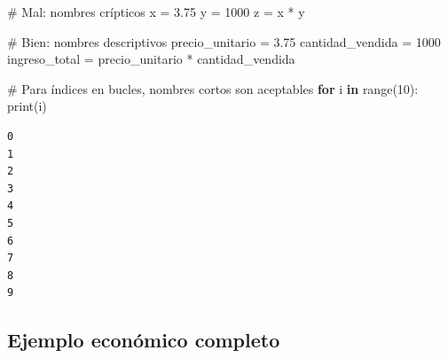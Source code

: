 \documentclass[
  doc,
  floatsintext,
  longtable,
  a4paper,
  nolmodern,
  notxfonts,
  notimes,
  12pt,
  colorlinks=true,linkcolor=blue,citecolor=blue,urlcolor=blue]{apa7}
\newenvironment{Shaded}{\begin{snugshade}}{\end{snugshade}}
\newcommand{\BuiltInTok}[1]{\textcolor[rgb]{0.00,0.23,0.31}{#1}}
\newcommand{\CommentTok}[1]{\textcolor[rgb]{0.37,0.37,0.37}{#1}}
\newcommand{\ControlFlowTok}[1]{\textcolor[rgb]{0.00,0.23,0.31}{\textbf{#1}}}
\newcommand{\DecValTok}[1]{\textcolor[rgb]{0.68,0.00,0.00}{#1}}
\newcommand{\FloatTok}[1]{\textcolor[rgb]{0.68,0.00,0.00}{#1}}
\newcommand{\KeywordTok}[1]{\textcolor[rgb]{0.00,0.23,0.31}{\textbf{#1}}}
\newcommand{\NormalTok}[1]{\textcolor[rgb]{0.00,0.23,0.31}{#1}}
\newcommand{\OperatorTok}[1]{\textcolor[rgb]{0.37,0.37,0.37}{#1}}
\begin{document}
\begin{Shaded}
\begin{Highlighting}[]
\CommentTok{\# Mal: nombres crípticos}
\NormalTok{x }\OperatorTok{=} \FloatTok{3.75}
\NormalTok{y }\OperatorTok{=} \DecValTok{1000}
\NormalTok{z }\OperatorTok{=}\NormalTok{ x }\OperatorTok{*}\NormalTok{ y}

\CommentTok{\# Bien: nombres descriptivos}
\NormalTok{precio\_unitario }\OperatorTok{=} \FloatTok{3.75}
\NormalTok{cantidad\_vendida }\OperatorTok{=} \DecValTok{1000}
\NormalTok{ingreso\_total }\OperatorTok{=}\NormalTok{ precio\_unitario }\OperatorTok{*}\NormalTok{ cantidad\_vendida}

\CommentTok{\# Para índices en bucles, nombres cortos son aceptables}
\ControlFlowTok{for}\NormalTok{ i }\KeywordTok{in} \BuiltInTok{range}\NormalTok{(}\DecValTok{10}\NormalTok{):}
    \BuiltInTok{print}\NormalTok{(i)}
\end{Highlighting}
\end{Shaded}

\begin{verbatim}
0
1
2
3
4
5
6
7
8
9
\end{verbatim}

\subsection{Ejemplo económico
completo}\label{ejemplo-econuxf3mico-completo}
\end{document}
